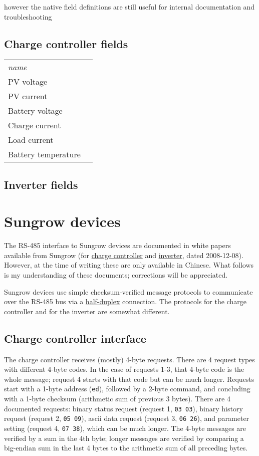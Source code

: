 \documentclass[pdftex,oneside,12pt,a4paper]{book}
\begin{document}
however the native field definitions are still useful for internal documentation and troubleshooting

\subsection{Charge controller fields}
\begin{supertabular}{ll}
\emph{\small name} & \\
PV voltage & \\
PV current & \\
Battery voltage & \\
Charge current & \\
Load current & \\
Battery temperature & \\
\end{supertabular}


\subsection{Inverter fields}

\section{Sungrow devices}
The RS-485 interface to Sungrow devices are documented in white papers
available from Sungrow (for \href{http://peatflux.censam.org/projects/peatflux/attachment/wiki/SungrowInterface/A-SD-00009-RJXY-01-C(1).pdf}{charge controller} and \href{http://peatflux.censam.org/projects/peatflux/attachment/wiki/SungrowInterface/SNSL上位机协议081208.pdf}{inverter}, dated 2008-12-08).  However, at the
time of writing these are only available in Chinese.  What follows is my
understanding of these documents; corrections will be appreciated.

Sungrow devices use simple checksum-verified message protocols to
communicate over the RS-485 bus via a \href{http://en.wikipedia.org/wiki/Duplex_%28telecommunications%29#Half-duplex}{half-duplex} connection.  The protocols for the charge controller and for the inverter are somewhat different.

\subsection{Charge controller interface}
The charge controller receives (mostly) 4-byte requests.  There are 4 request types with different 4-byte codes.  In the case of requests 1-3, that 4-byte code is the whole message; request 4 starts with that code but can be much longer.  Requests start with a 1-byte address (\verb|ed|), followed by a 2-byte command, and concluding with a 1-byte checksum (arithmetic sum of previous 3 bytes). There are 4 documented requests: binary status request (request 1, \verb|03 03|), binary history request (request 2, \verb|05 09|), ascii data request (request 3, \verb|06 26|), and parameter setting (request 4, \verb|07 38|), which can be much longer.  The 4-byte messages are verified by a sum in the 4th byte; longer messages are verified by comparing a big-endian sum in the last 4 bytes to the arithmetic sum of all preceding bytes.
\end{document}
